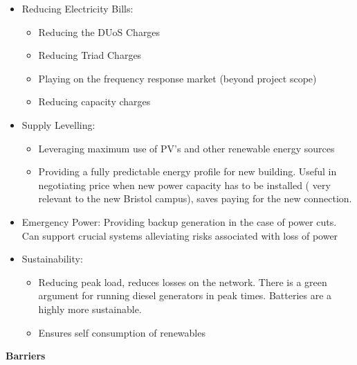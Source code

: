 \begin{itemize}
\tightlist
\item
  Reducing Electricity Bills:

  \begin{itemize}
  \tightlist
  \item
    Reducing the DUoS Charges
  \item
    Reducing Triad Charges
  \item
    Playing on the frequency response market (beyond project scope)
  \item
    Reducing capacity charges
  \end{itemize}
\item
  Supply Levelling:

  \begin{itemize}
  \tightlist
  \item
    Leveraging maximum use of PV's and other renewable energy sources
  \item
    Providing a fully predictable energy profile for new building.
    Useful in negotiating price when new power capacity has to be
    installed ( very relevant to the new Bristol campus), saves paying
    for the new connection. \cite{wpMWMD}
  \end{itemize}
\item
  Emergency Power: Providing backup generation in the case of power
  cuts. Can support crucial systems alleviating risks associated with
  loss of power
\item
  Sustainability:

  \begin{itemize}
  \tightlist
  \item
    Reducing peak load, reduces losses on the network. There is a green
    argument for running diesel generators in peak times. Batteries are
    a highly more sustainable.
  \item
    Ensures self consumption of renewables
  \end{itemize}
\end{itemize}

\textbf{Barriers}

